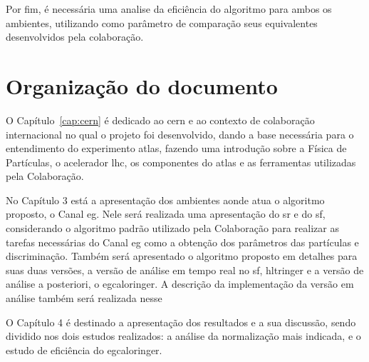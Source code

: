 Por fim, é necessária uma analise da eficiência do algoritmo para ambos os
ambientes, utilizando como parâmetro de comparação seus equivalentes 
desenvolvidos pela colaboração.

\section{Organização do documento} {{{

O Capítulo~\ref{cap:cern} é dedicado ao \gls{cern} e ao contexto de colaboração internacional
no qual o projeto foi desenvolvido, dando a base necessária para o entendimento
do experimento \gls{atlas}, fazendo uma introdução sobre a Física de Partículas,
o acelerador \gls{lhc}, os componentes do \gls{atlas} e as ferramentas
utilizadas pela Colaboração.

No Capítulo 3 está a apresentação dos ambientes aonde atua o algoritmo proposto,
o Canal \acrshort{eg}. Nele será realizada uma apresentação do \gls{sr} e do
\gls{sf}, considerando o algoritmo padrão utilizado pela Colaboração para
realizar as tarefas necessárias do Canal \gls{eg} como a obtenção dos parâmetros
das partículas e discriminação. Também será apresentado o algoritmo proposto em
detalhes para suas duas versões, a versão de análise em tempo real no \gls{sf},
\gls{hltringer} e a versão de análise a posteriori, o \gls{egcaloringer}. A
descrição da implementação da versão em análise também será realizada nesse 

O Capítulo 4 é destinado a apresentação dos resultados e a sua discussão,
sendo dividido nos dois estudos realizados: a análise da normalização mais
indicada, e o estudo de eficiência do \gls{egcaloringer}. 
}}}
